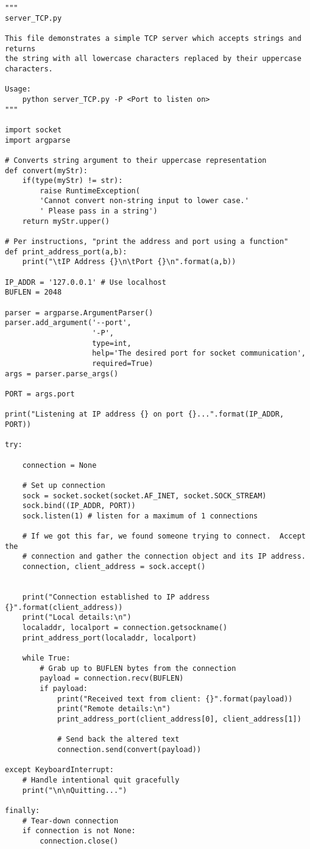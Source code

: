 \documentclass{article}
\begin{document}
\begin{verbatim}
"""
server_TCP.py

This file demonstrates a simple TCP server which accepts strings and returns
the string with all lowercase characters replaced by their uppercase
characters.

Usage:
    python server_TCP.py -P <Port to listen on>
"""

import socket
import argparse

# Converts string argument to their uppercase representation
def convert(myStr):
    if(type(myStr) != str):
        raise RuntimeException(
        'Cannot convert non-string input to lower case.'
        ' Please pass in a string')
    return myStr.upper()

# Per instructions, "print the address and port using a function"
def print_address_port(a,b):
    print("\tIP Address {}\n\tPort {}\n".format(a,b))

IP_ADDR = '127.0.0.1' # Use localhost
BUFLEN = 2048

parser = argparse.ArgumentParser()
parser.add_argument('--port',
                    '-P',
                    type=int,
                    help='The desired port for socket communication',
                    required=True)
args = parser.parse_args()

PORT = args.port

print("Listening at IP address {} on port {}...".format(IP_ADDR, PORT))

try:

    connection = None

    # Set up connection
    sock = socket.socket(socket.AF_INET, socket.SOCK_STREAM)
    sock.bind((IP_ADDR, PORT))
    sock.listen(1) # listen for a maximum of 1 connections

    # If we got this far, we found someone trying to connect.  Accept the
    # connection and gather the connection object and its IP address.
    connection, client_address = sock.accept()


    print("Connection established to IP address {}".format(client_address))
    print("Local details:\n")
    localaddr, localport = connection.getsockname()
    print_address_port(localaddr, localport)

    while True:
        # Grab up to BUFLEN bytes from the connection
        payload = connection.recv(BUFLEN)
        if payload:
            print("Received text from client: {}".format(payload))
            print("Remote details:\n")
            print_address_port(client_address[0], client_address[1])

            # Send back the altered text
            connection.send(convert(payload))

except KeyboardInterrupt:
    # Handle intentional quit gracefully
    print("\n\nQuitting...")

finally:
    # Tear-down connection
    if connection is not None:
        connection.close()
\end{verbatim}
\end{document}
